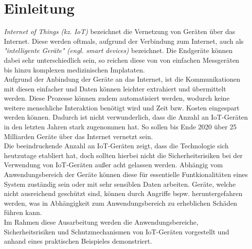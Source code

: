 \section{Einleitung}
\textit{Internet of Things (kz. IoT)} bezeichnet die Vernetzung von Geräten  über das Internet.
Diese werden oftmals, aufgrund der Verbindung zum Internet, auch als \textit{"intelligente Geräte" 
(engl. smart devices)} bezeichnet. Die Endgeräte können dabei sehr unterschiedlich sein, so reichen
diese von von einfachen Messgeräten bis hinzu komplexen medizinischen Implataten. \\

Aufgrund der Anbindung der Geräte an das Internet, ist die Kommunikationen mit diesen 
einfacher und Daten können leichter extrahiert und übermittelt werden. Diese Prozesse
können zudem automatisiert werden, wodurch keine weitere menschliche Interaktion
benötigt wird und Zeit bzw. Kosten eingespart werden können. Dadurch ist nicht verwunderlich,
dass die Anzahl an IoT-Geräten in den letzten Jahren stark zugenommen hat. So sollen bis Ende
2020 über 25 Milliarden Geräte über das Internet vernetzt sein.\\

Die beeindruckende Anzahl an IoT-Geräten zeigt, dass die Technologie sich heutzutage etabliert hat,
doch sollten hierbei nicht die Sicherheitsrisiken bei der Verwendung von IoT-Geräten außer acht
gelassen werden. Abhängig vom Anwendungsbereich der Geräte können diese für essentielle 
Funtkionalitäten eines System zuständig sein oder mit sehr sensiblen Daten arbeiten. 
Geräte, welche nicht ausreichend geschützt sind, können durch Angriffe bspw.  heruntergefahren
werden, was in Abhängigkeit zum Anwendungsbereich zu erheblichen Schäden führen kann. \\

Im Rahmen diese Ausarbeitung werden die Anwendungsbereiche, Sicherheitsrisiken und Schutzmechanismen
von IoT-Geräten vorgestellt und anhand eines praktischen Beispieles demonstriert.


  



